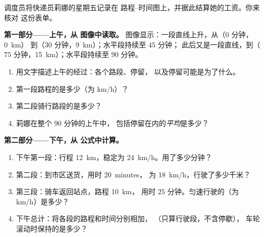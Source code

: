 \begin{problem}\label{pb:g7:motion-average-speed:1}
调度员将快递员莉娜的星期五记录在
路程–时间图上，并据此结算她的工资。你来核对
这份表单。

\medskip\noindent\textbf{第一部分——上午，从
图像中读取。}
图像显示：一段直线上升，从（$0$ 分钟，\qty{0}{km}）
到（$30$ 分钟，\qty{9}{km}）；水平段持续至 $45$ 分钟；
此后又是一段直线，到（$75$ 分钟，\qty{15}{km}）；水平段持续至 $90$ 分钟。
\begin{enumerate}
  \item 用文字描述上午的经过：各个路段、停留，
        以及停留可能是为了什么。
  \item 第一段路程的是多少（为 \unit{km/h}）？
  \item 第二段骑行路段的是多少？
  \item 莉娜在整个 $90$ 分钟的上午中，
        包括停留在内的\emph{平均}是多少？
\end{enumerate}

\medskip\noindent\textbf{第二部分——下午，从
公式中计算。}
\begin{enumerate}[resume]
  \item 下午第一段：行程 \qty{12}{km}，稳定为
        \qty{24}{km/h}。用了多少分钟？
  \item 第二段：到市区送货，用时 \qty{20}{minutes}，
        为 \qty{18}{km/h}，行驶了多少千米？
  \item 第三段：骑车返回站点，路程 \qty{10}{km}，
        用时 $25$ 分钟。匀速行驶的（为
        \unit{km/h}）是多少？
  \item 下午总计：将各段的路程和时间分别相加，
        （只算行驶段，不含停歇），
        车轮滚动时保持的是多少？
\end{enumerate}


\end{problem}
